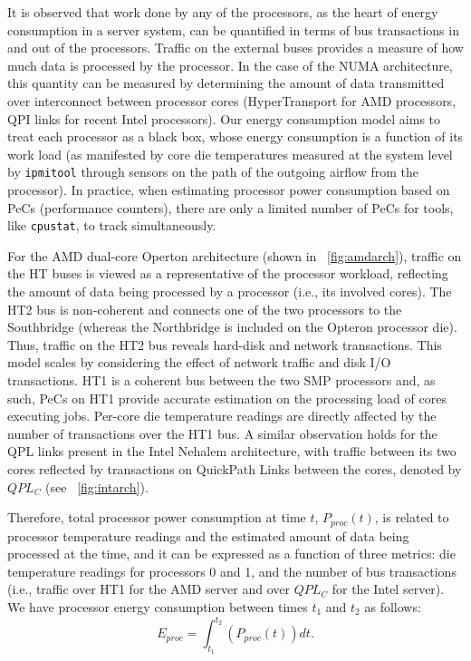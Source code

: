 It is observed that work done by any of the processors, as the heart of
energy consumption in a server system, can be quantified in terms of bus
transactions in and out of the processors.  Traffic on the external
buses provides a measure of how much data is processed by the processor.
In the case of the NUMA architecture, this quantity can be measured by
determining the amount of data transmitted over interconnect between
processor cores (HyperTransport for AMD processors, QPI links for recent
Intel processors). Our energy consumption model aims to treat each
processor as a black box, whose energy consumption is a function of its
work load (as manifested by core die temperatures measured at the system
level by \texttt{ipmitool} through sensors on the path of the outgoing
airflow from the processor).  In practice, when estimating processor
power consumption based on PeCs (performance counters), there are only a
limited number of PeCs for tools, like \texttt{cpustat}, to track
simultaneously.

For the AMD dual-core Operton architecture (shown in
\figurename~\ref{fig:amdarch}), traffic on the HT buses is viewed as a
representative of the processor workload, reflecting the amount of data
being processed by a processor (i.e., its involved cores).  The HT2 bus
is non-coherent and connects one of the two processors to the
Southbridge (whereas the Northbridge is included on the Opteron
processor die).  Thus, traffic on the HT2 bus reveals hard-disk and
network transactions.  This model scales by considering the effect of
network traffic and disk I/O transactions.  HT1 is a coherent bus
between the two SMP processors and, as such, PeCs on HT1 provide
accurate estimation on the processing load of cores executing jobs.
Per-core die temperature readings are directly affected by the number of
transactions over the HT1 bus.  A similar observation holds for the QPL
links present in the Intel Nehalem architecture, with traffic between
its two cores reflected by transactions on QuickPath Links between the
cores, denoted by $QPL_C$ (see \figurename~\ref{fig:intarch}).

Therefore, total processor power consumption at time $t$, $P_{proc}(t)$,
is related to processor temperature readings and the estimated amount of
data being processed at the time, and it can be expressed as a function
of three metrics: die temperature readings for processors 0 and 1, and
the number of bus transactions (i.e., traffic over HT1 for the AMD
server and over $QPL_C$ for the Intel server).  We have processor energy
consumption between times $t_{1}$ and $t_{2}$ as follows:
\begin{equation}
  \label{eq:procpwr2}
  E_{proc}=\displaystyle\int_{t_{1}}^{t_{2}}\left( {P_{proc}(t)} \right)dt.
\end{equation}
